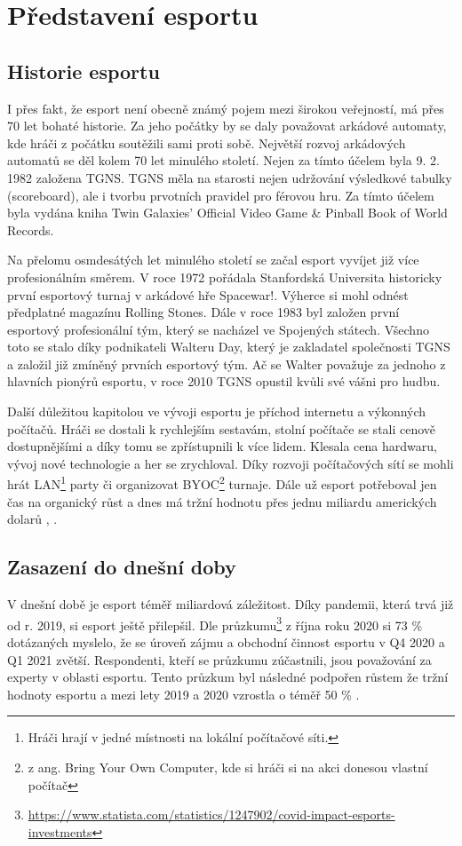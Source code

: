 \chapter{Představení esportu}
\section{Historie esportu}
I přes fakt, že esport není obecně známý pojem mezi širokou veřejností, má přes 70 let bohaté historie. Za jeho počátky by se
daly považovat arkádové automaty, kde hráči z počátku soutěžili sami proti sobě. Největší rozvoj arkádových automatů se děl kolem 70 let minulého 
století. Nejen za tímto účelem byla 9. 2. 1982 založena \ac{TGNS}. \ac{TGNS} měla na starosti nejen udržování výsledkové tabulky (scoreboard),
ale i tvorbu prvotních pravidel pro férovou hru. Za tímto účelem byla vydána kniha Twin Galaxies' Official Video Game \& Pinball Book of World Records.

Na přelomu osmdesátých let minulého století se začal esport vyvíjet již více profesionálním směrem. V roce 1972 pořádala Stanfordská Universita historicky první
esportový turnaj v arkádové hře Spacewar!. Výherce si mohl odnést předplatné magazínu Rolling Stones. Dále v roce 1983 byl založen první esportový profesionální tým,
který se nacházel ve Spojených státech. Všechno toto se stalo díky podnikateli Walteru Day, který je zakladatel společnosti \ac{TGNS} a založil již zmíněný
prvních esportový tým. Ač se Walter považuje za jednoho z hlavních pionýrů esportu, v roce 2010 \ac{TGNS} opustil kvůli své vášni pro hudbu.

Další důležitou kapitolou ve vývoji esportu je příchod internetu a výkonných počítačů. Hráči se dostali k rychlejším sestavám, stolní počítače se stali cenově dostupnějšími a díky tomu
se zpřístupnili k více lidem. Klesala cena hardwaru, vývoj nové technologie a her se zrychloval. Díky rozvoji počítačových sítí se mohli hrát LAN\footnote{Hráči hrají v jedné
místnosti na lokální počítačové síti.} party či organizovat BYOC\footnote{z ang. Bring Your Own Computer, kde si hráči si na akci donesou vlastní počítač} turnaje. Dále už esport 
potřeboval jen čas na organický růst a dnes má tržní hodnotu přes jednu miliardu amerických dolarů \cite{gough_global_2022}, \cite{larch_history_2022}.

\section{Zasazení do dnešní doby}
V dnešní době je esport téměř miliardová záležitost. Díky pandemii, která trvá již od r. 2019, si esport ještě přilepšil.
Dle průzkumu\footnote{\url{https://www.statista.com/statistics/1247902/covid-impact-esports-investments}}
z října roku 2020 si 73 \% dotázaných myslelo, že se úroveň zájmu a obchodní činnost esportu v Q4 2020 a Q1 2021
zvětší. Respondenti, kteří se průzkumu zúčastnili, jsou považování za experty v oblasti esportu. Tento průzkum byl následné podpořen růstem že tržní hodnoty
esportu a mezi lety 2019 a 2020 vzrostla o téměř 50 \% \cite{gough_global_2022}.

